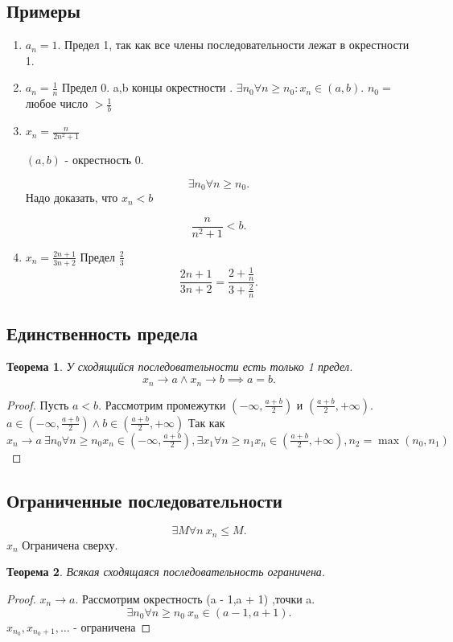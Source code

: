 \documentclass[a4paper]{scrartcl}
\newtheorem{theorem}{Теорема}
\begin{document}
\subsection{Примеры}
\begin{enumerate}
	\item $a_n = 1$. Предел 1, так как все члены последовательности лежат в окрестности 1.
	\item  $a_n = \frac{1}{n}$ Предел 0. a,b концы окрестности .
	      $\exists  n_0 \forall  n \ge n_0 : x_n \in (a,b)$. $n_0 = $ любое число $> \frac{1}{b}$
	\item
	      $x_n = \frac{n}{2n^2 + 1}$

	      $(a , b ) $ - окрестность 0.

	      \[
		      \exists  n_0  \forall n \ge  n_0
		      .\]
	      Надо доказать, что $x_n < b$

	      \[
		      \frac{n}{n^2 + 1} < b
		      .\]
	\item $x_n = \frac{2n + 1}{3n + 2}$ Предел $\frac{2}{3}$
	      \[
		      \frac{2n + 1}{3n + 2} = \frac{2 + \frac{1}{n}}{3 + \frac{2}{n}}
		      .\]
\end{enumerate}
\subsection{Единственность предела}
\begin{theorem}
	У сходящийся последовательности есть только 1 предел.
	\[
		x_n \rightarrow a  \land x_n \rightarrow b \implies a = b
		.\]
\end{theorem}
\begin{proof}
	Пусть $a < b$. Рассмотрим промежутки  $(-\infty , \frac{a + b}{2})$ и $( \frac{a+b}{2},+\infty )$.
	$a \in (-\infty, \frac{a + b }{2}) \land b \in ( \frac{a+b}{2},+\infty )$
	Так как $x_n \rightarrow a ~ \exists  n_0 \forall n \ge  n_0 x_n \in (-\infty,\frac{a + b}{2}),
		\exists x_1 \forall n \ge  n_1 x_n \in (\frac{a + b}{2}, +\infty) , n_2 = \max(n_0,n_1)$
\end{proof}
\subsection{Ограниченные последовательности}
\[
	\exists  M \forall n ~ x_n \le  M
	.\]
$x_n$ Ограничена сверху.
\begin{theorem}
	Всякая сходящаяся последовательность ограничена.
\end{theorem}
\begin{proof}
	$x_n \rightarrow a$. Рассмотрим  окрестность (a - 1,a + 1) ,точки a.
	\[
		\exists  n_0 \forall  n \ge  n_0 ~ x_n \in (a - 1, a  + 1)
		.\]
	$x_{n_0},x_{n_0 + 1}, \dots $  - ограничена
\end{proof}
\end{document}
